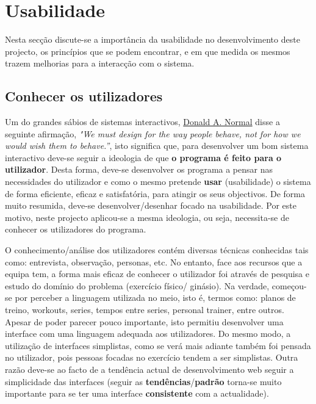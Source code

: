 \chapter{Usabilidade}
\label{chap:usabilidade}

\hspace{5mm} Nesta secção discute-se a importância da usabilidade no desenvolvimento deste projecto, os princípios que se podem encontrar, e em que medida os mesmos trazem melhorias para a interacção com o sistema.

\section{Conhecer os utilizadores}

\hspace{5mm} Um do grandes sábios de sistemas interactivos, \href{https://www.goodreads.com/quotes/8740235-we-must-design-for-the-way-people-behave-not-for}{Donald A. Normal} disse a seguinte afirmação, \textit{"We must design for the way people behave, not for how we would wish them to behave.”}, isto significa que, para desenvolver um bom sistema interactivo deve-se seguir a ideologia de que \textbf{o programa é feito para o utilizador}. Desta forma, deve-se desenvolver os programa a pensar nas necessidades do utilizador e como o mesmo pretende \textbf{usar} (usabilidade) o sistema de forma eficiente, eficaz e satisfatória, para atingir os seus objectivos. De forma muito resumida, deve-se desenvolver/desenhar focado na usabilidade. Por este motivo, neste projecto aplicou-se a mesma ideologia, ou seja, necessita-se de conhecer os utilizadores do programa.

\hspace{5mm} O conhecimento/análise dos utilizadores contém diversas técnicas conhecidas tais como: entrevista, observação, personas, etc. No entanto, face aos recursos que a equipa tem, a forma mais eficaz de conhecer o utilizador foi através de pesquisa e estudo do domínio do problema (exercício físico/ ginásio). Na verdade, começou-se por perceber a linguagem utilizada no meio, isto é, termos como: planos de treino, workouts, series, tempos entre series, personal trainer, entre outros. Apesar de poder parecer pouco importante, isto permitiu desenvolver uma interface com uma linguagem adequada aos utilizadores. Do mesmo modo, a utilização de interfaces simplistas, como se verá mais adiante também foi pensada no utilizador, pois pessoas focadas no exercício tendem a ser simplistas. Outra razão deve-se ao facto de a tendência actual de desenvolvimento web seguir a simplicidade das interfaces (seguir as \textbf{tendências}/\textbf{padrão} torna-se muito importante para se ter uma interface \textbf{consistente} com a actualidade).


